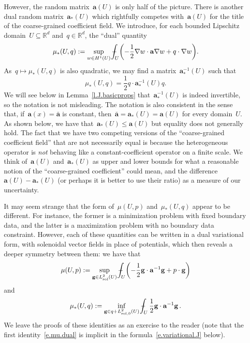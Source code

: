 \documentclass[11pt,twoside]{article} %
\numberwithin{equation}{section}
\theoremstyle{definition}
\let\originalleft\left
\let\originalright\right
\renewcommand{\left}{\mathopen{}\mathclose\bgroup\originalleft}
\renewcommand{\right}{\aftergroup\egroup\originalright}
\newcommand*{\Rd}{\ensuremath{\mathbb{R}^d}}
\newcommand{\g}{\mathbf{g}}
\newcommand{\sol}{\mathrm{sol}}
\renewcommand{\a}{\mathbf{a}}
\newcommand{\ahom}{\bar{\a}}
\def\Xint#1{\mathchoice
{\XXint\displaystyle\textstyle{#1}}%
{\XXint\textstyle\scriptstyle{#1}}%
{\XXint\scriptstyle\scriptscriptstyle{#1}}%
{\XXint\scriptscriptstyle\scriptscriptstyle{#1}}%
\!\int}
\def\XXint#1#2#3{{\setbox0=\hbox{$#1{#2#3}{\int}$}
\vcenter{\hbox{$#2#3$}}\kern-.5\wd0}}
\def\fint{\Xint-}
\begin{document}
However, the random matrix~$\a(U)$ is only half of the picture. There is another dual random matrix~$\a_*(U)$ which rightfully competes with~$\a(U)$ for the title of the coarse-grained coefficient field. We introduce, for each bounded Lipschitz domain~$U\subseteq\Rd$ and~$q\in\Rd$, the ``dual'' quantity 
\begin{equation}
\label{e.mustar}
\mu_*(U,q)
:= \sup_{w\in H^1(U)} 
\fint_U \left( -\frac12\nabla w \cdot \a\nabla w + q\cdot \nabla w \right). 
\end{equation}
As~$q\mapsto \mu_*(U,q)$ is also quadratic, we may find a matrix~$\a_*^{-1}(U)$ such that
\begin{equation}
\label{e.quad.mu.star}
\mu_*(U,q) = \frac12 q\cdot \a_*^{-1}(U) q.
\end{equation}
We will see below in Lemma~\ref{l.J.basicprops} that~$\a_*^{-1}(U)$ is indeed invertible, so the notation is not misleading.
The notation is also consistent in the sense that, if~$\a(x)=\ahom$ is constant, then~$\ahom = \a_*(U) = \a(U)$ for every domain~$U$. 
As shown below, we have that~$\a_*(U) \leq \a(U)$ but equality does not generally hold. 
The fact that we have two competing versions of the ``coarse-grained coefficient field'' that are not necessarily equal is because the heterogeneous operator is \emph{not} behaving like a constant-coefficient operator on a finite scale. We think of~$\a(U)$ and~$\a_*(U)$ as upper and lower bounds for what a reasonable notion of the ``coarse-grained coefficient'' could mean, and the difference~$\a(U)-\a_*(U)$ (or perhaps it is better to use their ratio) as a measure of our uncertainty.

\smallskip

It may seem strange that the form of~$\mu(U,p)$ and~$\mu_*(U,q)$ appear to be different. For instance, the former is a minimization problem with fixed boundary data, and the latter is a maximization problem with no boundary data constraint. However, each of these quantities can be written in a dual variational form, with solenoidal vector fields in place of potentials, which then reveals a deeper symmetry between them: we have that 
\begin{equation}
\label{e.mu.dual}
\mu(U,p) 
:= \sup_{\g \in L^2_{\sol}(U)} 
\fint_U \biggl(-\frac12\g \cdot \a^{-1} \g + p\cdot \g \biggr)
\end{equation}
and
\begin{equation}
\label{e.mustar.dual}
\mu_*(U,q) 
:= \inf_{\g \in q + L^2_{\sol,0}(U)} 
\fint_U \frac12\g \cdot \a^{-1} \g \,.
\end{equation}
We leave the proofs of these identities as an exercise to the reader (note that the first identity~\eqref{e.mu.dual} is implicit in the formula~\eqref{e.variational.J} below).
\end{document}
